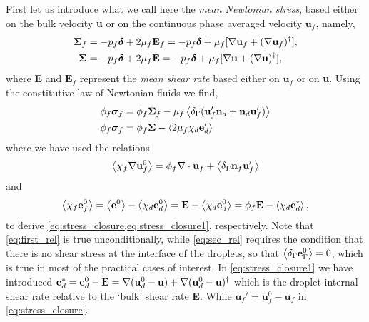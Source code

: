First let us introduce what we call here the \textit{mean Newtonian stress}, based either on the bulk velocity \textbf{u} or on the continuous phase averaged velocity $\textbf{u}_f$, namely,
\begin{align}
    \bm\Sigma_f 
    &
    = -p_f \bm\delta + 2\mu_f \textbf{E}_f    
    = -p_f \bm\delta + \mu_f [\mathbf{\nabla} \textbf{u}_f + (\mathbf{\nabla} \textbf{u}_f)^{\dagger}], 
    \\
    \bm\Sigma &
    = -p_f\bm\delta + 2 \mu_f \textbf{E}
    = -p_f \bm\delta + \mu_f [\mathbf{\nabla} \textbf{u} + (\mathbf{\nabla} \textbf{u})^{\dagger}],
\end{align}
where \textbf{E} and $\textbf{E}_f$ represent the \textit{mean shear rate} based either on $\textbf{u}_f$ or on \textbf{u}. 
Using the constitutive law of Newtonian fluids we find, 
\begin{align}
    \phi_f \bm\sigma_f 
    &=
    \phi_f \bm\Sigma_f
    - \mu_f \avg{\delta_\Gamma( \textbf{u}_f'  \textbf{n}_d +  \textbf{n}_d \textbf{u}_f' )}
    \label{eq:stress_closure}\\
    \phi_f \bm\sigma_f 
    &=
    \phi_f \bm\Sigma
    - \avg{2\mu_f \chi_d \textbf{e}_d'}
    \label{eq:stress_closure1}
\end{align}
where we have used the relations 
\begin{equation}
    \avg{\chi_f \grad \textbf{u}_f^0}
    = 
    \phi_f \div  \textbf{u}_f
    + \avg{\delta_\Gamma \textbf{n}_f \textbf{u}_f'}
    \label{eq:first_rel}
\end{equation}
and
\begin{equation}
    \avg{\chi_f \textbf{e}_f^0}
    = 
    \avg{\textbf{e}^0}
    - \avg{\chi_d \textbf{e}_d^0}
    = 
    \textbf{E}
    - \avg{\chi_d \textbf{e}_d^0}
    = 
    \phi_f \textbf{E}
    - \avg{\chi_d \textbf{e}_d^*},
    \label{eq:sec_rel}
\end{equation}
to derive \ref{eq:stress_closure,eq:stress_closure1}, respectively. 
Note that \ref{eq:first_rel} is true unconditionally, while \ref{eq:sec_rel} requires the condition that there is no shear stress at the interface of the droplets, so that $\left<\delta_\Gamma \textbf{e}_\Gamma^0\right>= 0$, which is true in most of the practical cases of interest. 
In \ref{eq:stress_closure1} we have introduced $\textbf{e}_d^* = \textbf{e}_d^0 - \textbf{E} = \mathbf{\nabla} (\textbf{u}_d^0-\textbf{u})+\mathbf{\nabla} (\textbf{u}_d^0-\textbf{u})^\dagger$ which is the droplet internal shear rate relative to the `bulk' shear rate \textbf{E}.
While $\textbf{u}_f' = \textbf{u}_f^0 - \textbf{u}_f$ in \ref{eq:stress_closure}. 


